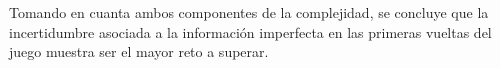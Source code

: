 Tomando en cuanta ambos componentes de la complejidad, se concluye que la 
incertidumbre asociada a la información imperfecta en las primeras vueltas del juego 
muestra ser el mayor reto a superar. 








